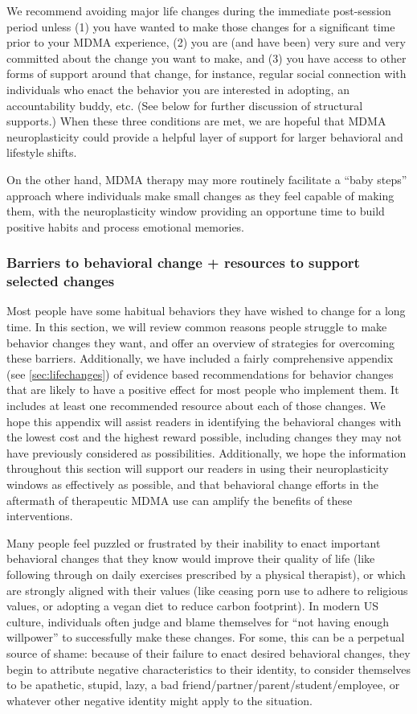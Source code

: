 \documentclass[12pt,letterpaper]{article}
\begin{document}
We recommend avoiding major life changes during the immediate post-session period unless (1) you have wanted to make those changes for a significant time prior to your MDMA experience, (2) you are (and have been) very sure and very committed about the change you want to make, and (3) you have access to other forms of support around that change, for instance, regular social connection with individuals who enact the behavior you are interested in adopting, an accountability buddy, etc. (See below for further discussion of structural supports.)  When these three conditions are met, we are hopeful that MDMA neuroplasticity could provide a helpful layer of support for larger behavioral and lifestyle shifts.

On the other hand, MDMA therapy may more routinely facilitate a “baby steps” approach where individuals make small changes as they feel capable of making them, with the neuroplasticity window providing an opportune time to build positive habits and process emotional memories.

\subsubsection*{Barriers to behavioral change + resources to support selected changes}

Most people have some habitual behaviors they have wished to change for a long time. In this section, we will review common reasons people struggle to make behavior changes they want, and offer an overview of strategies for overcoming these barriers. Additionally, we have included a fairly comprehensive appendix (see \ref{sec:lifechanges}) of evidence based recommendations for behavior changes that are likely to have a positive effect for most people who implement them. It includes at least one recommended resource about each of those changes. We hope this appendix will assist readers in identifying the behavioral changes with the lowest cost and the highest reward possible, including changes they may not have previously considered as possibilities. Additionally, we hope the information throughout this section will support our readers in using their neuroplasticity windows as effectively as possible, and that behavioral change efforts in the aftermath of therapeutic MDMA use can amplify the benefits of these interventions.

Many people feel puzzled or frustrated by their inability to enact important behavioral changes that they know would improve their quality of life (like following through on daily exercises prescribed by a physical therapist), or which are strongly aligned with their values (like ceasing porn use to adhere to religious values, or adopting a vegan diet to reduce carbon footprint). In modern US culture, individuals often judge and blame themselves for “not having enough willpower” to successfully make these changes. For some, this can be a perpetual source of shame: because of their failure to enact desired behavioral changes, they begin to attribute negative characteristics to their identity, to consider themselves to be apathetic, stupid, lazy, a bad friend/partner/parent/student/employee, or whatever other negative identity might apply to the situation.
\end{document}
